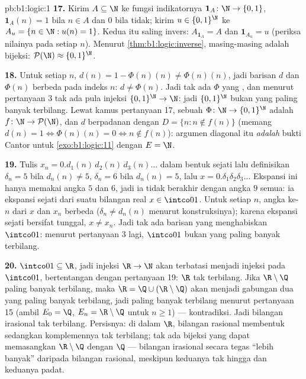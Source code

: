 \begin{solution}{pb:b1:logic:1}
\textbf{17.} Kirim $A \subseteq \N$ ke fungsi indikatornya $\mathbf 1_A
\colon \N \to \{0,1\}$, $\mathbf 1_A(n) = 1$ bila $n \in A$ dan $0$
bila tidak; kirim $u \in \{0,1\}^{\N}$ ke $A_u = \{n \in \N : u(n) =
1\}$. Kedua  itu saling invers: $A_{\mathbf 1_A} = A$ dan
$\mathbf 1_{A_u} = u$ (periksa nilainya pada setiap $n$). Menurut
\cref{thm:b1:logic:inverse}, masing-masing adalah bijeksi: $\mathcal{P}(\N)
\approx \{0,1\}^{\N}$.

\textbf{18.} Untuk setiap $n$, $d(n) = 1 - \Phi(n)(n) \neq \Phi(n)(n)$,
jadi barisan $d$ dan $\Phi(n)$ berbeda pada indeks $n$: $d \neq
\Phi(n)$. Jadi tak ada $\Phi$ yang , dan menurut pertanyaan 3 tak ada pula
injeksi $\{0,1\}^{\N} \to \N$: jadi $\{0,1\}^{\N}$ bukan  yang
paling banyak terbilang. Lewat kamus pertanyaan 17, sebuah  $\Phi
\colon \N \to \{0,1\}^{\N}$ adalah  $f \colon \N \to
\mathcal{P}(\N)$, dan $d$ berpadanan dengan  $D = \{n : n
\notin f(n)\}$ (memang $d(n) = 1 \iff \Phi(n)(n) = 0 \iff n \notin
f(n)$): argumen diagonal itu \emph{adalah} bukti Cantor untuk
\cref{exo:b1:logic:11} dengan $E = \N$.

\textbf{19.} Tulis $x_n = 0.d_1(n)\,d_2(n)\,d_3(n)\dots$ dalam bentuk
sejati lalu definisikan $\delta_n = 5$ bila $d_n(n) \neq 5$, $\delta_n = 6$
bila $d_n(n) = 5$, lalu $x = 0.\delta_1\delta_2\delta_3\dots$ Ekspansi
ini hanya memakai angka $5$ dan $6$, jadi ia tidak berakhir dengan
angka $9$ semua: ia ekspansi sejati dari suatu bilangan real $x \in \intco01$.
Untuk setiap $n$, angka ke-$n$ dari $x$ dan $x_n$ berbeda
($\delta_n \neq d_n(n)$ menurut konstruksinya); karena ekspansi sejati
bersifat tunggal, $x \neq x_n$. Jadi tak ada barisan yang menghabiskan $\intco01$: menurut
pertanyaan 3 lagi, $\intco01$ bukan  yang paling banyak terbilang.

\textbf{20.} $\intco01 \subseteq \R$, jadi injeksi $\R \to \N$
akan terbatasi menjadi injeksi pada $\intco01$, bertentangan dengan pertanyaan 19:
$\R$ tak terbilang. Jika $\R \setminus \Q$ paling banyak terbilang,
maka $\R = \Q \cup (\R \setminus \Q)$ akan menjadi gabungan dua  yang paling
banyak terbilang, jadi paling banyak terbilang menurut pertanyaan 15 (ambil
$E_0 = \Q$, $E_n = \R \setminus \Q$ untuk $n \geq 1$) ---
kontradiksi. Jadi bilangan irasional tak terbilang. Persisnya:
di dalam $\R$, bilangan rasional membentuk  sedangkan
komplemennya tak terbilang; tak ada bijeksi yang dapat memasangkan $\R
\setminus \Q$ dengan $\Q$ --- bilangan irasional secara tegas ``lebih banyak''
daripada bilangan rasional, meskipun keduanya tak hingga dan keduanya padat.


\end{solution}

